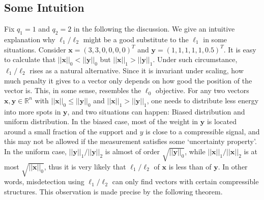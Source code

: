 \documentclass[11pt]{article}
\numberwithin{equation}{section}
\theoremstyle{plain}
\theoremstyle{definition}
\def\R{{\mathbb R}}
\def\R{{\mathbb R}}
\def\x{{\mathbf x}}
\def\y{{\mathbf{y}}}
\begin{document}
\subsection{Some Intuition}

Fix $q_1=1$ and $q_2=2$ in the following the discussion. We give an intuitive explanation why $\ell_1/\ell_2$ might be a good substitute to the $\ell_1$ in some situations. Consider $\x=(3,3,0,0,0,0)^T$ and $\y=(1,1,1,1,1,0.5)^T$. It is easy to calculate that $||\x||_0<||\y||_0$ but $||\x||_1>||\y||_1$. Under such circumstance, $\ell_1/\ell_2$ rises as a natural alternative. Since it is invariant under scaling, how much penalty it gives to a vector only depends on how good the position of the vector is. This, in some sense, resembles the $\ell_0$ objective. For any two vectors $\x, \y\in\R^n$ with $||\x||_0\leq ||\y||_0$ and $||\x||_1>||\y||_1$, one needs to distribute less energy into more spots in $\y$, and two situations can happen: Biased distribution and uniform distribution. In the biased case, most of the weight in $\y$ is located around a small fraction of the support and $y$ is close to a compressible signal, and this may not be allowed if the measurement satisfies some `uncertainty property'. In the uniform case, $||\y||_1/||\y||_2$ is almost of order $\sqrt{||\y||_0}$, while $||\x||_1/||\x||_2$ is at most $\sqrt{||\x||_0}$, thus it is very likely that $\ell_1/\ell_2$ of $\x$ is less than of $\y$. In other words, misdetection using $\ell_1/\ell_2$ can only find vectors with certain compressible structures. This observation is made precise by the following theorem.      
\end{document}
